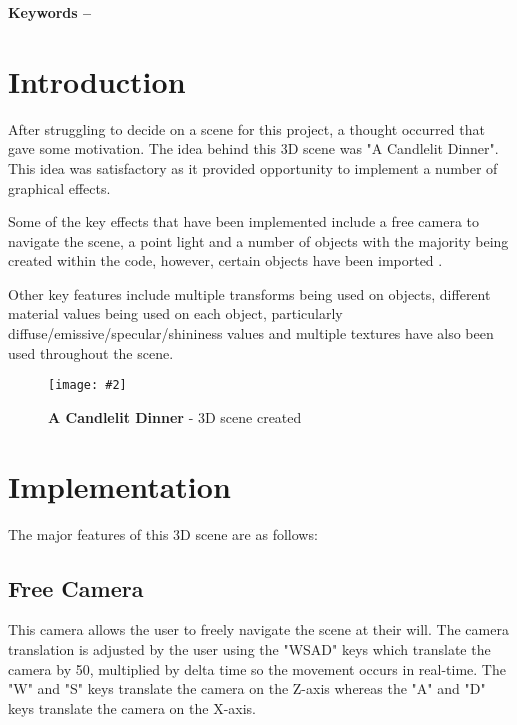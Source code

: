 \documentclass[10pt, a4paper]{article}
\title{\mytitle}
\author{\myauthor\hspace{1em}\\\contact\\Edinburgh Napier University\hspace{0.5em}-\hspace{0.5em}\mymodule}
\date{}
\newcommand{\figuremacro}[5]{
    \begin{figure}[#1]
        \centering
        \texttt{[image: \#2]}
        \caption[#3]{\textbf{#3}#4}
        \label{fig:#2}
    \end{figure}
}
\begin{document}
	\maketitle
	\begin{abstract}
	The aim of this project was to create a 3D scene using OpenGL. A number of techniques to be used were referenced in the coursework specification, but the freedom to create whatever scene came to mind was left unrestricted. This report details the features implemented within the code and the thought process used when planning the project and considering additional features.
	\end{abstract}
    
	\textbf{Keywords -- }{\mykeywords}
	\section{Introduction}
    After struggling to decide on a scene for this project, a thought occurred that gave some motivation. The idea behind this 3D scene was "A Candlelit Dinner". This idea was satisfactory as it provided opportunity to implement a number of graphical effects.  
   
    Some of the key effects that have been implemented include a free camera to navigate the scene, a point light and a number of objects with the majority being created within the code, however, certain objects have been imported \cite{Chair}.
    
    Other key features include multiple transforms being used on objects, different material values being used on each object, particularly diffuse/emissive/specular/shininess values and multiple textures have also been used throughout the scene.
    
    \figuremacro{h}{scene}{A Candlelit Dinner}{ - 3D scene created}{1.0}
	
	\section{Implementation}
	The major features of this 3D scene are as follows:

	\subsection{Free Camera}
	This camera allows the user to freely navigate the scene at their will. The camera translation is adjusted by the user using the "WSAD" keys which translate the camera by 50, multiplied by delta time so the movement occurs in real-time. The "W" and "S" keys translate the camera on the Z-axis whereas the "A" and "D" keys translate the camera on the X-axis.
\end{document}
